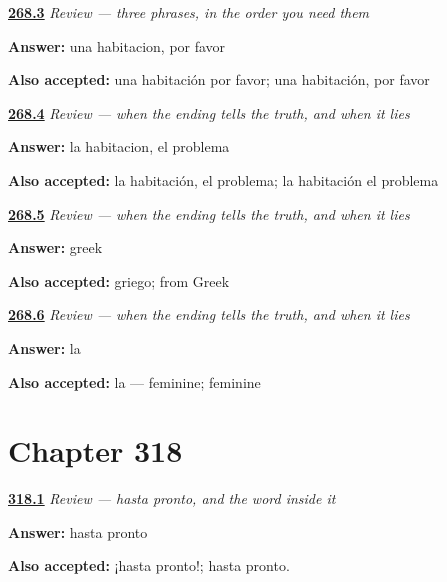 \noindent\begin{minipage}[t]{\linewidth}
\raggedright
\hyperlink{review-ES-C268-repaso-llegar-y-quedarse-room}{\textbf{268.3}} \emph{Review — three phrases, in the order you need them}\par
\small \textbf{Answer:} una habitacion, por favor\par
\footnotesize \textbf{Also accepted:} una habitación por favor; una habitación, por favor
\end{minipage}\par\medskip

\noindent\begin{minipage}[t]{\linewidth}
\raggedright
\hyperlink{review-ES-C268-repaso-dos-finales-dos-generos-articles}{\textbf{268.4}} \emph{Review — when the ending tells the truth, and when it lies}\par
\small \textbf{Answer:} la habitacion, el problema\par
\footnotesize \textbf{Also accepted:} la habitación, el problema; la habitación el problema
\end{minipage}\par\medskip

\noindent\begin{minipage}[t]{\linewidth}
\raggedright
\hyperlink{review-ES-C268-repaso-dos-finales-dos-generos-why}{\textbf{268.5}} \emph{Review — when the ending tells the truth, and when it lies}\par
\small \textbf{Answer:} greek\par
\footnotesize \textbf{Also accepted:} griego; from Greek
\end{minipage}\par\medskip

\noindent\begin{minipage}[t]{\linewidth}
\raggedright
\hyperlink{review-ES-C268-repaso-dos-finales-dos-generos-cion}{\textbf{268.6}} \emph{Review — when the ending tells the truth, and when it lies}\par
\small \textbf{Answer:} la\par
\footnotesize \textbf{Also accepted:} la — feminine; feminine
\end{minipage}\par\medskip

\section*{Chapter 318}

\noindent\begin{minipage}[t]{\linewidth}
\raggedright
\hyperlink{review-ES-C318-repaso-despedirse-soon}{\textbf{318.1}} \emph{Review — hasta pronto, and the word inside it}\par
\small \textbf{Answer:} hasta pronto\par
\footnotesize \textbf{Also accepted:} ¡hasta pronto!; hasta pronto.
\end{minipage}\par\medskip

